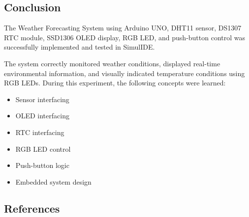 
\subsection{Conclusion}

The Weather Forecasting System using Arduino UNO, DHT11 sensor, DS1307 RTC module, SSD1306 OLED display, RGB LED, and push-button control was successfully implemented and tested in SimulIDE.

The system correctly monitored weather conditions, displayed real-time environmental information, and visually indicated temperature conditions using RGB LEDs.
\clearpage
During this experiment, the following concepts were learned:

\begin{itemize}

\item Sensor interfacing

\item OLED interfacing

\item RTC interfacing

\item RGB LED control

\item Push-button logic

\item Embedded system design

\end{itemize}


\subsection{References}

